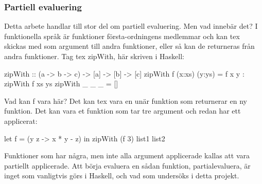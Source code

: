 \documentclass[Rapport]{subfiles}
\begin{document}
\subsubsection{Partiell evaluering}
Detta arbete handlar till stor del om partiell evaluering. Men vad innebär det?
I funktionella språk är funktioner första-ordningens medlemmar och kan tex
skickas med som argument till andra funktioner, eller så kan de returneras från
andra funktioner. Tag tex zipWith, här skriven i Haskell:
\begin{codeEx}
zipWith :: (a -> b -> c) -> [a] -> [b] -> [c]
zipWith f (x:xs) (y:ys) = f x y : zipWith f xs ys
zipWith _ _      _      = []
\end{codeEx}
Vad kan f vara här? Det kan tex vara en unär funktion som returnerar en ny
funktion. Det kan vara et funktion som tar tre argument och redan har ett
applicerat:
\begin{codeEx}
let f = (\x y z -> x * y - z)
in  zipWith (f 3) list1 list2
\end{codeEx}
Funktioner som har några, men inte alla argument applicerade kallas att vara
partiellt applicerade. Att börja evaluera en sådan funktion, partialevaluera,
är inget som vanligtvis görs i Haskell, och vad som undersöks i detta projekt. 
\end{document}
